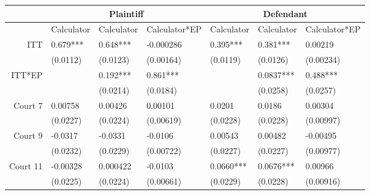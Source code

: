 \begin{tabular}{rrrrrrr}
\toprule
      & \multicolumn{3}{c}{Plaintiff} & \multicolumn{3}{c}{Defendant} \\
\midrule
      & \multicolumn{1}{c}{Calculator} & \multicolumn{1}{c}{Calculator} & \multicolumn{1}{c}{Calculator*EP} & \multicolumn{1}{c}{Calculator} & \multicolumn{1}{c}{Calculator} & \multicolumn{1}{c}{Calculator*EP} \\
ITT   & \multicolumn{1}{l}{0.679***} & \multicolumn{1}{l}{0.648***} & \multicolumn{1}{l}{-0.000286} & \multicolumn{1}{l}{0.395***} & \multicolumn{1}{l}{0.381***} & \multicolumn{1}{l}{0.00219} \\
      & \multicolumn{1}{l}{(0.0112)} & \multicolumn{1}{l}{(0.0123)} & \multicolumn{1}{l}{(0.00164)} & \multicolumn{1}{l}{(0.0119)} & \multicolumn{1}{l}{(0.0126)} & \multicolumn{1}{l}{(0.00234)} \\
ITT*EP & \multicolumn{1}{l}{} & \multicolumn{1}{l}{0.192***} & \multicolumn{1}{l}{0.861***} & \multicolumn{1}{l}{} & \multicolumn{1}{l}{0.0837***} & \multicolumn{1}{l}{0.488***} \\
      & \multicolumn{1}{l}{} & \multicolumn{1}{l}{(0.0214)} & \multicolumn{1}{l}{(0.0184)} & \multicolumn{1}{l}{} & \multicolumn{1}{l}{(0.0258)} & \multicolumn{1}{l}{(0.0257)} \\
Court 7 & \multicolumn{1}{l}{0.00758} & \multicolumn{1}{l}{0.00426} & \multicolumn{1}{l}{0.00101} & \multicolumn{1}{l}{0.0201} & \multicolumn{1}{l}{0.0186} & \multicolumn{1}{l}{0.00304} \\
      & \multicolumn{1}{l}{(0.0227)} & \multicolumn{1}{l}{(0.0224)} & \multicolumn{1}{l}{(0.00619)} & \multicolumn{1}{l}{(0.0228)} & \multicolumn{1}{l}{(0.0228)} & \multicolumn{1}{l}{(0.00997)} \\
Court 9 & \multicolumn{1}{l}{-0.0317} & \multicolumn{1}{l}{-0.0331} & \multicolumn{1}{l}{-0.0106} & \multicolumn{1}{l}{0.00543} & \multicolumn{1}{l}{0.00482} & \multicolumn{1}{l}{-0.00495} \\
      & \multicolumn{1}{l}{(0.0232)} & \multicolumn{1}{l}{(0.0229)} & \multicolumn{1}{l}{(0.00722)} & \multicolumn{1}{l}{(0.0227)} & \multicolumn{1}{l}{(0.0227)} & \multicolumn{1}{l}{(0.00977)} \\
Court 11 & \multicolumn{1}{l}{-0.00328} & \multicolumn{1}{l}{0.000422} & \multicolumn{1}{l}{-0.0103} & \multicolumn{1}{l}{0.0660***} & \multicolumn{1}{l}{0.0676***} & \multicolumn{1}{l}{0.00966} \\
      & \multicolumn{1}{l}{(0.0225)} & \multicolumn{1}{l}{(0.0224)} & \multicolumn{1}{l}{(0.00661)} & \multicolumn{1}{l}{(0.0229)} & \multicolumn{1}{l}{(0.0228)} & \multicolumn{1}{l}{(0.00916)} \\

\end{tabular}

